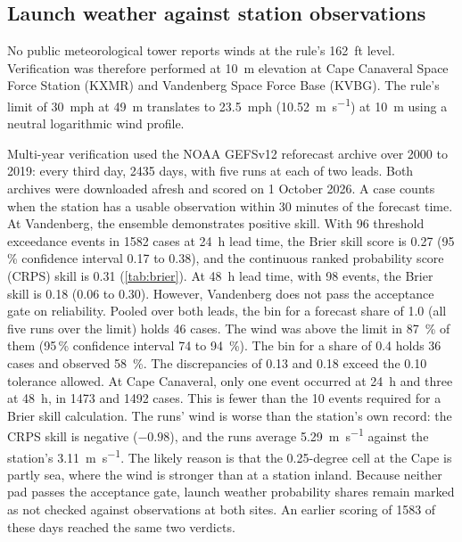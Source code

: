 \documentclass[11pt,a4paper]{article}
\begin{document}
\subsection{Launch weather against station observations}

No public meteorological tower reports winds at the rule's \qty{162}{ft} level.
Verification was therefore performed at \qty{10}{\m} elevation at Cape Canaveral Space Force
Station (KXMR) and Vandenberg Space Force Base (KVBG). The rule's limit of \qty{30}{mph} at
\qty{49}{\m} translates to \qty{23.5}{mph} (\qty{10.52}{\m\per\s}) at \qty{10}{\m} using a
neutral logarithmic wind profile.

Multi-year verification used the NOAA GEFSv12 reforecast archive over 2000 to 2019: every
third day, \num{2435} days, with five runs at each of two leads. Both archives were downloaded
afresh and scored on 1 October 2026. A case counts when the station has a usable observation
within 30 minutes of the forecast time. At Vandenberg, the ensemble demonstrates positive skill.
With 96 threshold exceedance events in \num{1582} cases at \qty{24}{\hour} lead time, the Brier
skill score is 0.27 (95\,\% confidence interval 0.17 to 0.38), and the continuous ranked
probability score (CRPS) skill is 0.31 (\cref{tab:brier}). At \qty{48}{\hour} lead time, with 98
events, the Brier skill is 0.18 (0.06 to 0.30). However, Vandenberg does not pass the acceptance
gate on reliability. Pooled over both leads, the bin for a forecast share of 1.0 (all five runs
over the limit) holds 46 cases. The wind was above the limit in \qty{87}{\percent} of them
(95\,\% confidence interval 74 to \qty{94}{\percent}). The bin for a share of 0.4 holds 36 cases
and observed \qty{58}{\percent}. The discrepancies of 0.13 and 0.18 exceed the 0.10 tolerance
allowed. At Cape Canaveral, only one event occurred at \qty{24}{\hour} and three at
\qty{48}{\hour}, in \num{1473} and \num{1492} cases. This is fewer than the 10 events required
for a Brier skill calculation. The runs' wind is worse than the station's own record: the CRPS
skill is negative ($-0.98$), and the runs average \qty{5.29}{\m\per\s} against the station's
\qty{3.11}{\m\per\s}. The likely reason is that the 0.25-degree cell at the Cape is partly sea,
where the wind is stronger than at a station inland. Because neither pad passes the acceptance
gate, launch weather probability shares remain marked as not checked against observations at
both sites. An earlier scoring of \num{1583} of these days reached the same two verdicts.
\end{document}
